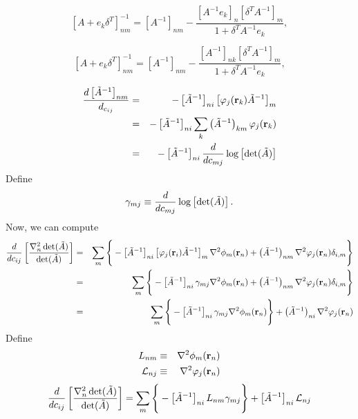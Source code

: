 \documentclass[letterpaper]{article}
\begin{document}
\begin{equation}
\left[A + e_k\delta^T\right]^{-1}_{nm} = \left[A^{-1}\right]_{nm} - \frac{\left[A^{-1}e_k\right]_n\left[\delta^T
  A^{-1}\right]_m}{1 + \delta^T A^{-1}e_k},
\end{equation}

\begin{equation}
\left[A + e_k\delta^T\right]^{-1}_{nm} = \left[A^{-1}\right]_{nm} - \frac{\left[A^{-1}\right]_{nk}\left[\delta^T
  A^{-1}\right]_m}{1 + \delta^T A^{-1}e_k},
\end{equation}

\begin{eqnarray}
\frac{d \left[\tilde{A}^{-1}\right]_{nm}}{d_{c_{ij}}} & = &
-\left[\tilde{A}^{-1}\right]_{ni}\left[\varphi_j(\mathbf{r}_k)\tilde{A}^{-1}\right]_m  \\
& = & -\left[\tilde{A}^{-1}\right]_{ni} \sum_k \left(\tilde{A}^{-1}\right)_{km} \varphi_j(\mathbf{r}_k) \\
& = & -\left[\tilde{A}^{-1}\right]_{ni} \frac{d}{d c_{mj}} \log\left[\det(\tilde{A})\right]
\end{eqnarray}
Define
\begin{equation}
\gamma_{mj} \equiv \frac{d}{d c_{mj}} \log\left[\det(\tilde{A})\right].
\end{equation}
Now, we can compute
\begin{eqnarray}
\frac{d}{dc_{ij}} \left[\frac{\nabla^2_n
    \det(\Aopt)}{\det(\Aopt)}\right] & = & \sum_m \left\{\rule{0cm}{0.6cm}
-\left[\Aopt^{-1}\right]_{ni}\left[\varphi_j(\vr_i)\Aopt^{-1}\right]_m
\nabla^2 \phi_m(\vr_n) +
\left(\Aopt^{-1}\right)_{nm} \nabla^2 \varphi_j(\vr_n)\delta_{i,m} \right\} \nonumber \\
& = & \sum_m \left\{\rule{0cm}{0.6cm}
-\left[\Aopt^{-1}\right]_{ni} \gamma_{mj}
\nabla^2 \phi_m(\vr_n) +
\left(\Aopt^{-1}\right)_{nm} \nabla^2 \varphi_j(\vr_n) \delta_{i,m}\right\} \\ 
& = & \sum_m \left\{\rule{0cm}{0.6cm}
-\left[\Aopt^{-1}\right]_{ni} \gamma_{mj}
\nabla^2 \phi_m(\vr_n) \right\}+
\left(\Aopt^{-1}\right)_{ni} \nabla^2 \varphi_j(\vr_n)
\end{eqnarray}
Define
\begin{eqnarray}
L_{nm} & \equiv & \nabla^2\phi_m(\mathbf{r}_n) \\
\mathcal{L}_{nj} & \equiv & \nabla^2\varphi_j(\mathbf{r}_n)
\end{eqnarray}
\begin{equation}
\frac{d}{dc_{ij}} \left[\frac{\nabla^2_n \det(\Aopt)}{\det(\Aopt)}\right] =
\sum_m  \left\{\rule{0cm}{0.6cm}
-\left[\Aopt^{-1}\right]_{ni} L_{nm} \gamma_{mj} \right\} + \left[\Aopt^{-1}\right]_{ni} \mathcal{L}_{nj}
\end{equation}
\end{document}
